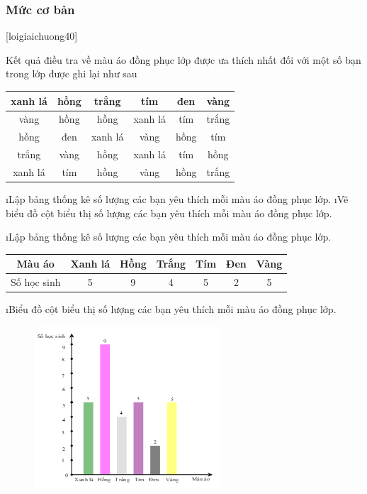 \subsubsection*{Mức cơ bản}
[loigiaichuong40]
\begin{bt}
	Kết quả điều tra về màu áo đồng phục lớp được ưa thích nhất đối với một số bạn trong lớp được ghi lại như sau
	\begin{center}
		\begin{tabular}{|c|c|c|c|c|c|}
			\hline
			xanh lá	&hồng&	trắng&	tím&	đen&	vàng\\
			\hline
			vàng	&hồng&	hồng&	xanh lá&	tím	&trắng\\
			\hline
			hồng	&đen&	xanh lá&	vàng&	hồng&	tím\\
			\hline
			trắng	&vàng&	hồng&	xanh lá&	tím&	hồng\\
			\hline
			xanh lá	&tím&	hồng&	vàng&	hồng&	trắng\\
			\hline
		\end{tabular}
	\end{center}
	\begin{enumerate}[a),leftmargin=*]
		\i Lập bảng thống kê số lượng các bạn yêu thích mỗi màu áo đồng phục lớp.
		\i Vẽ biểu đồ cột biểu thị số lượng các bạn yêu thích mỗi màu áo đồng phục lớp.
	\end{enumerate}
	\begin{loigiaichuong40}
		\begin{enumerate}[a),leftmargin=*]
			\i Lập bảng thống kê số lượng các bạn yêu thích mỗi màu áo đồng phục lớp.
			\begin{center}
				\begin{tabular}{|c|c|c|c|c|c|c|}
					\hline
						Màu áo&	Xanh lá&	Hồng&	Trắng&	Tím&	Đen&	Vàng\\
						\hline
					Số học sinh& 5&9&4&5&2&5\\	 
					\hline
				\end{tabular}
			\end{center}
			\i Biểu đồ cột biểu thị số lượng các bạn yêu thích mỗi màu áo đồng phục lớp. 
			\begin{figure}[H]
				\centering
				\vspace*{-5pt}
				\captionsetup{labelformat= empty, justification=centering}
				\includegraphics[width=0.5\linewidth]{9}
				\vspace*{-10pt}
			\end{figure}
		\end{enumerate}
	\end{loigiaichuong40}
\end{bt}
